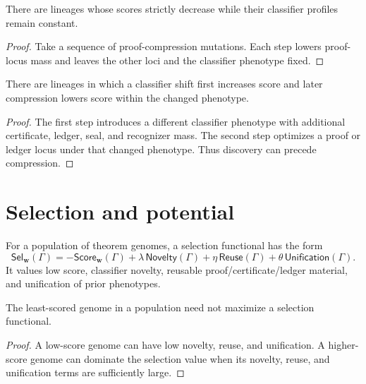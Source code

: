 \begin{theorem}
\label{thm:theorem-genome-lineage-improve-without-discovering}
There are lineages whose scores strictly decrease while their classifier
profiles remain constant.
\end{theorem}
\begin{proof}
Take a sequence of proof-compression mutations. Each step lowers proof-locus
mass and leaves the other loci and the classifier phenotype fixed.
\end{proof}

\begin{theorem}
\label{thm:theorem-genome-lineage-discover-before-compress}
There are lineages in which a classifier shift first increases score and later
compression lowers score within the changed phenotype.
\end{theorem}
\begin{proof}
The first step introduces a different classifier phenotype with additional
certificate, ledger, seal, and recognizer mass. The second step optimizes a
proof or ledger locus under that changed phenotype. Thus discovery can precede
compression.
\end{proof}

\section{Selection and potential}
\label{sec:theorem-genome-selection-potential}

\begin{definition}
\label{def:theorem-genome-selection-functional}
For a population of theorem genomes, a selection functional has the form
$$
\mathsf{Sel}_{\mathbf w}(\Gamma)
=
-\mathsf{Score}_{\mathbf w}(\Gamma)
+\lambda\,\mathsf{Novelty}(\Gamma)
+\eta\,\mathsf{Reuse}(\Gamma)
+\theta\,\mathsf{Unification}(\Gamma).
$$
It values low score, classifier novelty, reusable proof/certificate/ledger
material, and unification of prior phenotypes.
\end{definition}

\begin{theorem}
\label{thm:theorem-genome-shortest-not-research-favorable}
The least-scored genome in a population need not maximize a selection
functional.
\end{theorem}
\begin{proof}
A low-score genome can have low novelty, reuse, and unification. A higher-score
genome can dominate the selection value when its novelty, reuse, and
unification terms are sufficiently large.
\end{proof}

